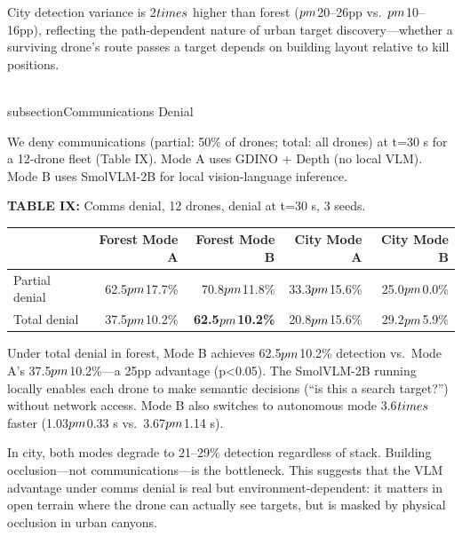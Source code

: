 \documentclass[conference]{IEEEtran}
\begin{document}
City detection variance is 2$\\times$ higher than forest ($\\pm$20--26pp
vs.~$\\pm$10--16pp), reflecting the path-dependent nature of urban target
discovery---whether a surviving drone's route passes a target depends on
building layout relative to kill positions.

\\subsection{Communications Denial}\label{b.-communications-denial}

We deny communications (partial: 50\% of drones; total: all drones) at
t=30 s for a 12-drone fleet (Table IX). Mode A uses GDINO + Depth (no
local VLM). Mode B uses SmolVLM-2B for local vision-language inference.

\textbf{TABLE IX:} Comms denial, 12 drones, denial at t=30 s, 3 seeds.

{\def\LTcaptype{none} %
\begin{longtable}[]{@{}lrrrr@{}}
\toprule\noalign{}
& Forest Mode A & Forest Mode B & City Mode A & City Mode B \\
\midrule\noalign{}
\endhead
\bottomrule\noalign{}
\endlastfoot
Partial denial & 62.5$\\pm$17.7\% & 70.8$\\pm$11.8\% & 33.3$\\pm$15.6\% & 25.0$\\pm$0.0\% \\
Total denial & 37.5$\\pm$10.2\% & \textbf{62.5$\\pm$10.2\%} & 20.8$\\pm$15.6\% &
29.2$\\pm$5.9\% \\
\end{longtable}
}

Under total denial in forest, Mode B achieves 62.5$\\pm$10.2\% detection
vs.~Mode A's 37.5$\\pm$10.2\%---a 25pp advantage (p\textless0.05). The
SmolVLM-2B running locally enables each drone to make semantic decisions
(``is this a search target?'') without network access. Mode B also
switches to autonomous mode 3.6$\\times$ faster (1.03$\\pm$0.33 s vs.~3.67$\\pm$1.14 s).

In city, both modes degrade to 21--29\% detection regardless of stack.
Building occlusion---not communications---is the bottleneck. This
suggests that the VLM advantage under comms denial is real but
environment-dependent: it matters in open terrain where the drone can
actually see targets, but is masked by physical occlusion in urban
canyons.
\end{document}
